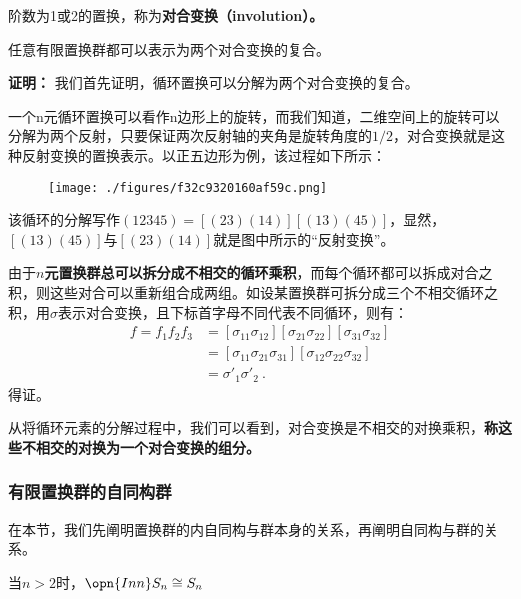 
\begin{issues}
\issueTODO
\end{issues}
\begin{definition}{}
阶数为1或2的置换，称为\textbf{对合变换（involution）。}
\end{definition}
\begin{theorem}{}
任意有限置换群都可以表示为两个对合变换的复合。
\end{theorem}
\textbf{证明：}
我们首先证明，循环置换可以分解为两个对合变换的复合。

一个n元循环置换可以看作n边形上的旋转，而我们知道，二维空间上的旋转可以分解为两个反射，只要保证两次反射轴的夹角是旋转角度的$1/2$，对合变换就是这种反射变换的置换表示。以正五边形为例，该过程如下所示：
\begin{figure}[ht]
\centering
\texttt{[image: ./figures/f32c9320160af59c.png]}
\caption{} \label{fig_AutSym_2}
\end{figure}
该循环的分解写作$(12345)=[(23)(14)][(13)(45)]$，显然，$[(13)(45)]$与$[(23)(14)]$就是图中所示的“反射变换”。

由于\textbf{$n$元置换群总可以拆分成不相交的循环乘积}，而每个循环都可以拆成对合之积，则这些对合可以重新组合成两组。如设某置换群可拆分成三个不相交循环之积，用$\sigma$表示对合变换，且下标首字母不同代表不同循环，则有：
\begin{equation}
\begin{aligned}
f=f_1f_2f_3&=[\sigma_{11}\sigma_{12}][\sigma_{21}\sigma_{22}][\sigma_{31}\sigma_{32}]\\
&=[\sigma_{11}\sigma_{21}\sigma_{31}][\sigma_{12}\sigma_{22}\sigma_{32}]\\
&=\sigma'_1\sigma'_2~.
\end{aligned}
\end{equation}
得证。

从将循环元素的分解过程中，我们可以看到，对合变换是不相交的对换乘积，\textbf{称这些不相交的对换为一个对合变换的组分。}
\subsubsection{有限置换群的自同构群}
在本节，我们先阐明置换群的内自同构与群本身的关系，再阐明自同构与群的关系。
\begin{theorem}{}\label{the_AutSym_1}
当$n>2$时，$\opn{Inn}S_n\cong S_n$
\end{theorem}

